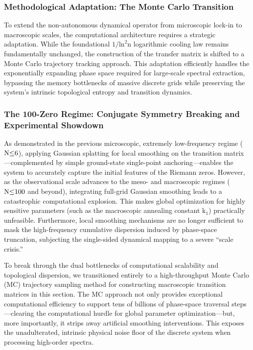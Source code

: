 \documentclass[fleqn,10pt]{wlscirep}
\begin{document}
\subsubsection*{Methodological Adaptation: The Monte Carlo Transition}

To extend the non-autonomous dynamical operator from microscopic lock-in
to macroscopic scales, the computational architecture requires a
strategic adaptation. While the foundational
\(\text{1/}\text{ln}^{\text{2}}\text{n}\) logarithmic cooling law
remains fundamentally unchanged, the construction of the transfer matrix
is shifted to a Monte Carlo trajectory tracking approach. This
adaptation efficiently handles the exponentially expanding phase space
required for large-scale spectral extraction, bypassing the memory
bottlenecks of massive discrete grids while preserving the system's
intrinsic topological entropy and transition dynamics.

\subsubsection*{The 100-Zero Regime: Conjugate Symmetry Breaking and Experimental Showdown}

As demonstrated in the previous microscopic, extremely low-frequency
regime (\(\text{N}\text{\ensuremath{\le}6}\)), applying Gaussian splatting for local
smoothing on the transition matrix---complemented by simple ground-state
single-point anchoring---enables the system to accurately capture the
initial features of the Riemann zeros. However, as the observational
scale advances to the meso- and macroscopic regimes
(\(\text{N}\text{\ensuremath{\le}100}\) and beyond), integrating full-grid Gaussian
smoothing leads to a catastrophic computational explosion. This makes
global optimization for highly sensitive parameters (such as the
macroscopic annealing constant \(\text{k}_{\text{1}}\)) practically
unfeasible. Furthermore, local smoothing mechanisms are no longer
sufficient to mask the high-frequency cumulative dispersion induced by
phase-space truncation, subjecting the single-sided dynamical mapping to
a severe ``scale crisis.''

To break through the dual bottlenecks of computational scalability and
topological dispersion, we transitioned entirely to a high-throughput
Monte Carlo (MC) trajectory sampling method for constructing macroscopic
transition matrices in this section. The MC approach not only provides
exceptional computational efficiency to support tens of billions of
phase-space traversal steps---clearing the computational hurdle for
global parameter optimization---but, more importantly, it strips away
artificial smoothing interventions. This exposes the unadulterated,
intrinsic physical noise floor of the discrete system when processing
high-order spectra.
\end{document}
